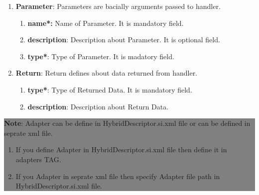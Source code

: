 \begin{enumerate}
\begin{enumerate}
\begin{enumerate}
				\end{enumerate}

				
				\begin{enumerate}

					\item \small \textbf{Parameter}: Parameters are bacially arguments passed to handler.


						\begin{enumerate}
	
							\item \small \textbf{name*:} Name of Parameter. It is mandatory field.
							\item \small \textbf{description}: Description about Parameter. It is optional field.
							\item \small \textbf{type*}: Type of Parameter. It is madatory field.			
		
						\end{enumerate}	
	
				
					\item \small \textbf{Return}: Return defines about data returned from handler.

						\begin{enumerate}

							\item \small \textbf{type*}: Type of Returned Data. It is mandatory field.
							\item \small \textbf{description}: Description about Return Data.
			
						\end{enumerate}

				\end{enumerate}


			\begin{center}
				\colorbox{grey}{
					\parbox[t]{.8\linewidth}{
						\fontsize{11pt}{11pt}\selectfont %
						\vspace*{0.1cm} %
		
						\hfill \textbf{Note}: Adapter can be define in HybridDescriptor.si.xml file or can be defined in seprate xml file.\\

						\hfill 	
						\begin{enumerate}
			
							\item \small If you define Adapter in HybridDescriptor.si.xml file then define it in adapters TAG.
							\item \small If you Adapter in seprate xml file then specify Adapter file path in HybridDescriptor.si.xml file.


\end{enumerate}}}
\end{center}
\end{enumerate}
\end{enumerate}
